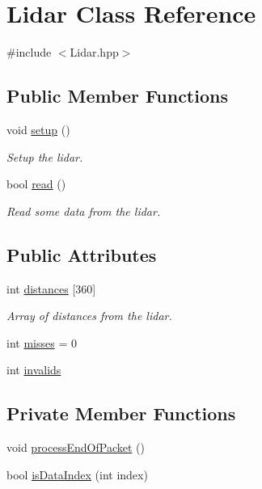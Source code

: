 \hypertarget{classLidar}{\section{Lidar Class Reference}
\label{classLidar}
}


{\ttfamily \#include $<$Lidar.\-hpp$>$}

\subsection*{Public Member Functions}
\begin{DoxyCompactItemize}
\item 
void \hyperlink{classLidar_abbb8e57bb39cb156cd03b9274843b32d}{setup} ()
\begin{DoxyCompactList}\small\item\em Setup the lidar. \end{DoxyCompactList}\item 
bool \hyperlink{classLidar_a424a60f6278617333201c5fca115c288}{read} ()
\begin{DoxyCompactList}\small\item\em Read some data from the lidar. \end{DoxyCompactList}\end{DoxyCompactItemize}
\subsection*{Public Attributes}
\begin{DoxyCompactItemize}
\item 
int \hyperlink{classLidar_a5f97323ace606c1b4d2f817ebb8ebf7d}{distances} \mbox{[}360\mbox{]}
\begin{DoxyCompactList}\small\item\em Array of distances from the lidar. \end{DoxyCompactList}\item 
int \hyperlink{classLidar_a8eea2300d585c1b514ac6211a7326aca}{misses} = 0
\item 
int \hyperlink{classLidar_a43a0f4c1f8d6b0c9f1b21be32c99890d}{invalids}
\end{DoxyCompactItemize}
\subsection*{Private Member Functions}
\begin{DoxyCompactItemize}
\item 
void \hyperlink{classLidar_a64a54013a7ef0612c3c0f9f89dc93024}{process\-End\-Of\-Packet} ()
\item 
bool \hyperlink{classLidar_aefa743ccb6305927a312f9579e003f82}{is\-Data\-Index} (int index)
\end{DoxyCompactItemize}
